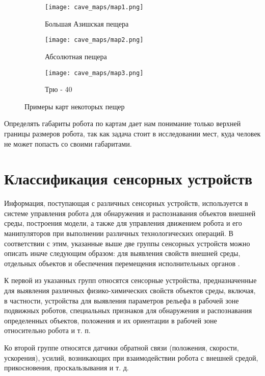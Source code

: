 \begin{figure}[H]
\begin{subfigure}{0.8\textwidth}
\centering\texttt{[image: cave\_maps/map1.png]}\\
\caption{Большая Азишская пещера}
\label{fig:ice}
\end{subfigure}

\begin{subfigure}{0.8\textwidth}
\centering\texttt{[image: cave\_maps/map2.png]}\\
\caption{Абсолютная пещера}
\end{subfigure}

\begin{subfigure}{0.8\textwidth}
\centering\texttt{[image: cave\_maps/map3.png]}\\
\caption{Трю - 40}
\end{subfigure}
\caption{Примеры карт некоторых пещер}
\end{figure}

Определять габариты робота по картам дает нам понимание только верхней границы размеров робота, так как задача стоит в исследовании мест, куда человек не может попасть со своими габаритами.



\section{Классификация сенсорных устройств}
Информация, поступающая с различных сенсорных устройств, используется в системе управления робота для обнаружения и распознавания объектов внешней среды, построения модели, а также для управления движением робота и его манипуляторов при выполнении различных технологических операций. В соответствии с этим, указанные выше две группы сенсорных устройств можно описать иначе следующим образом: для выявления свойств внешней среды, отдельных объектов и обеспечения перемещения исполнительных органов \cite{2013,1984,2015}.

К первой из указанных групп относятся сенсорные устройства, предназначенные для выявления различных физико-химических свойств объектов среды, включая, в частности, устройства для выявления параметров рельефа в рабочей зоне подвижных роботов, специальных признаков для обнаружения и распознавания определенных объектов, положения и их ориентации в рабочей зоне относительно робота и т. п.

Ко второй группе относятся датчики обратной связи (положения, скорости, ускорения), усилий, возникающих при взаимодействии робота с внешней средой, прикосновения, проскальзывания и т. д.

